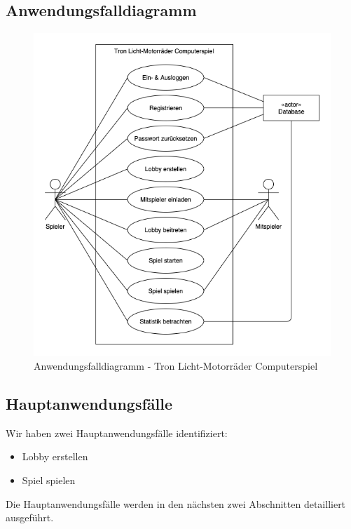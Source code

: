 \documentclass[11pt,ngerman]{article}
\begin{document}
    \subsection{Anwendungsfalldiagramm}
        \begin{figure}[H]
            \includegraphics[scale=0.77]{figures/Use-case-modell.png}
            \caption{Anwendungsfalldiagramm - Tron Licht-Motorräder Computerspiel}
        \end{figure}

    \subsection{Hauptanwendungsfälle}
        Wir haben zwei Hauptanwendungsfälle identifiziert:
         \begin{itemize}
            \item \Gls{Lobby} erstellen
            \item Spiel spielen
        \end{itemize}
        Die Hauptanwendungsfälle werden in den nächsten zwei Abschnitten detailliert ausgeführt.
\end{document}
